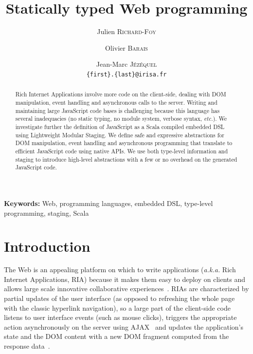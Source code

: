 \documentclass[american,english,runningheads]{llncs}
\newcommand{\etal}{\emph{et al.~}}
\newcommand{\etc}{\emph{etc.}}
\newcommand{\aka}{\emph{a.k.a.}}
\newcommand{\noun}[1]{\textsc{#1}}
\begin{document}
\title{Statically typed Web programming}

\author{Julien \noun{Richard-Foy} \and Olivier \noun{Barais} \and Jean-Marc \noun{Jézéquel}\\
\texttt{\{first\}.\{last\}@irisa.fr}}

\authorrunning{Julien \noun{Richard-Foy} \etal{}}

\maketitle


\begin{abstract}
Rich Internet Applications involve more code on the client-side, dealing with DOM manipulation, event handling and
asynchronous calls to the server. Writing and maintaining large JavaScript code bases is challenging because this
language has several inadequacies (no static typing, no module system, verbose syntax, \etc{}). We investigate
further the definition of JavaScript as a Scala compiled embedded DSL using Lightweight Modular Staging. We define
safe and expressive abstractions for DOM manipulation, event handling and asynchronous programming that translate to
efficient JavaScript code using native APIs. We use both type-level information and staging to introduce high-level
abstractions with a few or no overhead on the generated JavaScript code.
\end{abstract}

{\bf Keywords:} Web, programming languages, embedded DSL, type-level programming, staging, Scala

\section{Introduction}

The Web is an appealing platform on which to write applications (\aka{} Rich Internet Applications, RIA) because it
makes them easy to deploy on clients and allows large scale innovative collaborative
experiences~\cite{Farrell07_RIA,Mikkonen08_SpaghettiJs}. RIAs are characterized by partial updates of the user
interface (as opposed to refreshing the whole page with the classic hyperlink navigation), so a large part of the
client-side code listens to user interface events (such as mouse clicks), triggers the appropriate action
asynchronously on the server using AJAX~\cite{Garrett05_Ajax} and updates the application’s state and the DOM content
with a new DOM fragment computed from the response data~\cite{Farrell07_RIA,Busch09_StateOfArtRIA}.
\end{document}

